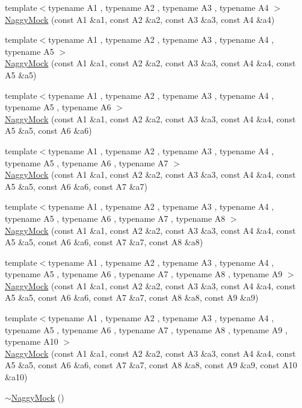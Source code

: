 \begin{DoxyCompactItemize}
\item 
{\footnotesize template$<$typename A1 , typename A2 , typename A3 , typename A4 $>$ }\\\mbox{\hyperlink{classtesting_1_1_naggy_mock_aa7d63f62600171db931c6bbb4c2a6d52}{Naggy\+Mock}} (const A1 \&a1, const A2 \&a2, const A3 \&a3, const A4 \&a4)
\item 
{\footnotesize template$<$typename A1 , typename A2 , typename A3 , typename A4 , typename A5 $>$ }\\\mbox{\hyperlink{classtesting_1_1_naggy_mock_ac751c8a708935bd8558c9665160f7144}{Naggy\+Mock}} (const A1 \&a1, const A2 \&a2, const A3 \&a3, const A4 \&a4, const A5 \&a5)
\item 
{\footnotesize template$<$typename A1 , typename A2 , typename A3 , typename A4 , typename A5 , typename A6 $>$ }\\\mbox{\hyperlink{classtesting_1_1_naggy_mock_aac4c0986e917a5d6e515f8dc0e7bf644}{Naggy\+Mock}} (const A1 \&a1, const A2 \&a2, const A3 \&a3, const A4 \&a4, const A5 \&a5, const A6 \&a6)
\item 
{\footnotesize template$<$typename A1 , typename A2 , typename A3 , typename A4 , typename A5 , typename A6 , typename A7 $>$ }\\\mbox{\hyperlink{classtesting_1_1_naggy_mock_ad1edac1991dd20514e822c90d6896c74}{Naggy\+Mock}} (const A1 \&a1, const A2 \&a2, const A3 \&a3, const A4 \&a4, const A5 \&a5, const A6 \&a6, const A7 \&a7)
\item 
{\footnotesize template$<$typename A1 , typename A2 , typename A3 , typename A4 , typename A5 , typename A6 , typename A7 , typename A8 $>$ }\\\mbox{\hyperlink{classtesting_1_1_naggy_mock_a63b30506f56b792ffbdc5792a9630d5e}{Naggy\+Mock}} (const A1 \&a1, const A2 \&a2, const A3 \&a3, const A4 \&a4, const A5 \&a5, const A6 \&a6, const A7 \&a7, const A8 \&a8)
\item 
{\footnotesize template$<$typename A1 , typename A2 , typename A3 , typename A4 , typename A5 , typename A6 , typename A7 , typename A8 , typename A9 $>$ }\\\mbox{\hyperlink{classtesting_1_1_naggy_mock_a786f31ade7b8b9f6e78e07f51cc0e14b}{Naggy\+Mock}} (const A1 \&a1, const A2 \&a2, const A3 \&a3, const A4 \&a4, const A5 \&a5, const A6 \&a6, const A7 \&a7, const A8 \&a8, const A9 \&a9)
\item 
{\footnotesize template$<$typename A1 , typename A2 , typename A3 , typename A4 , typename A5 , typename A6 , typename A7 , typename A8 , typename A9 , typename A10 $>$ }\\\mbox{\hyperlink{classtesting_1_1_naggy_mock_aa40a39806b939f423696f9380de3172b}{Naggy\+Mock}} (const A1 \&a1, const A2 \&a2, const A3 \&a3, const A4 \&a4, const A5 \&a5, const A6 \&a6, const A7 \&a7, const A8 \&a8, const A9 \&a9, const A10 \&a10)
\item 
\mbox{\hyperlink{classtesting_1_1_naggy_mock_a9d00e4811942489b4c3cdd8e8c658518}{$\sim$\+Naggy\+Mock}} ()
\end{DoxyCompactItemize}
